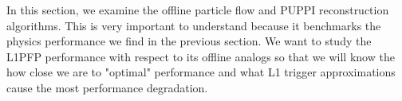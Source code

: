 In this section, we examine the offline particle flow and PUPPI reconstruction algorithms.  
This is very important to understand because it benchmarks the physics performance we find in the previous section. 
We want to study the L1PFP performance with respect to its offline analogs so that we will know
the how close we are to "optimal" performance and what L1 trigger approximations cause the most performance degradation.